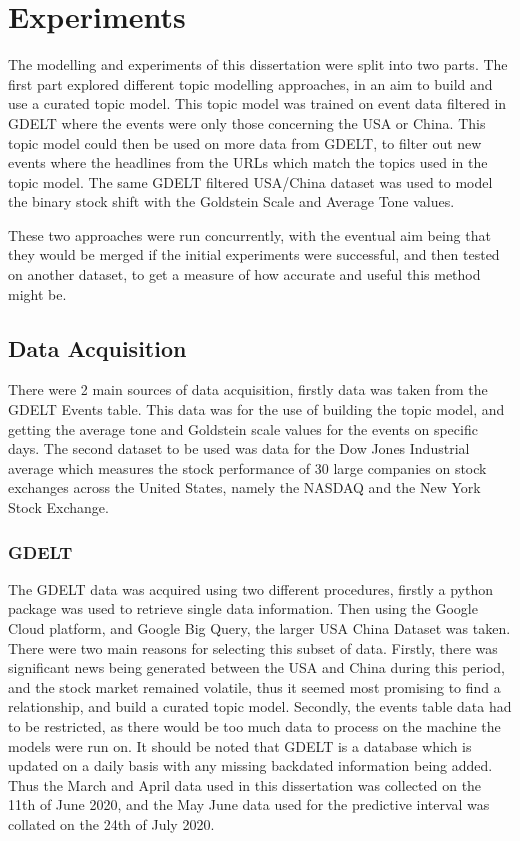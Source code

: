 \section{Experiments}
\label{experiments}
The modelling and experiments of this dissertation were split into two parts. The first part explored different topic modelling approaches, in an aim to build and use a curated topic model. This topic model was trained on event data filtered in GDELT where the events were only those concerning the USA or China. This topic model could then be used on more data from GDELT, to filter out new events where the headlines from the URLs which match the topics used in the topic model. The same GDELT filtered USA/China dataset was used to model the binary stock shift with the Goldstein Scale and Average Tone values. 

These two approaches were run concurrently, with the eventual aim being that they would be merged if the initial experiments were successful, and then tested on another dataset, to get a measure of how accurate and useful this method might be. 

\subsection{Data Acquisition}
There were 2 main sources of data acquisition, firstly data was taken from the GDELT Events table. This data was for the use of building the topic model, and getting the average tone and Goldstein scale values for the events on specific days. The second dataset to be used was data for the Dow Jones Industrial average which measures the stock performance of 30 large companies on stock exchanges across the United States, namely the NASDAQ and the New York Stock Exchange.

\subsubsection{GDELT}
The GDELT data was acquired using two different procedures, firstly a python package was used to retrieve single data information. Then using the Google Cloud platform, and Google Big Query, the larger USA China Dataset was taken. There were two main reasons for selecting this subset of data. Firstly, there was significant news being generated between the USA and China during this period, and the stock market remained volatile, thus it seemed most promising to find a relationship, and build a curated topic model. Secondly, the events table data had to be restricted, as there would be too much data to process on the machine the models were run on. It should be noted that GDELT is a database which is updated on a daily basis with any missing backdated information being added. Thus the March and April data used in this dissertation was collected on the 11th of June 2020, and the May June data used for the predictive interval was collated on the 24th of July 2020. 

